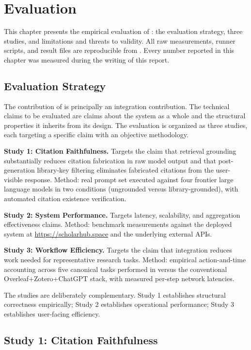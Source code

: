 \chapter{Evaluation}
\label{ch:evaluation}

This chapter presents the empirical evaluation of \sh{}: the evaluation strategy, three studies, and limitations and threats to validity. All raw measurements, runner scripts, and result files are reproducible from . Every number reported in this chapter was measured during the writing of this report.

\section{Evaluation Strategy}
\label{sec:eval-strategy}

The contribution of \sh{} is principally an integration contribution. The technical claims to be evaluated are claims about the system as a whole and the structural properties it inherits from its design. The evaluation is organized as three studies, each targeting a specific claim with an objective methodology.

\textbf{Study 1: Citation Faithfulness.} Targets the claim that retrieval grounding substantially reduces citation fabrication in raw model output and that post-generation library-key filtering eliminates fabricated citations from the user-visible response. Method: real prompt set executed against four frontier large language models in two conditions (ungrounded versus library-grounded), with automated citation existence verification.

\textbf{Study 2: System Performance.} Targets latency, scalability, and aggregation effectiveness claims. Method: benchmark measurements against the deployed system at \url{https://scholarhub.space} and the underlying external APIs.

\textbf{Study 3: Workflow Efficiency.} Targets the claim that integration reduces work needed for representative research tasks. Method: empirical action-and-time accounting across five canonical tasks performed in \sh{} versus the conventional Overleaf+Zotero+ChatGPT stack, with measured per-step network latencies.

The studies are deliberately complementary. Study 1 establishes structural correctness empirically; Study 2 establishes operational performance; Study 3 establishes user-facing efficiency.

\section{Study 1: Citation Faithfulness}
\label{sec:eval-study1}

